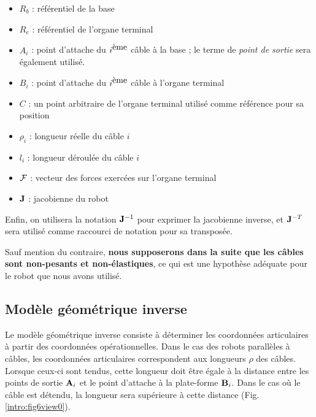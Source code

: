 \begin{itemize}
 \item $R_b$ : référentiel de la base
 \item $R_e$ : référentiel de l'organe terminal
 \item $A_i$ : point d'attache du $i^{\hbox{ème}}$ câble à la base ; le terme 
de 
{\it point de sortie} sera également utilisé.
 \item $B_i$ : point d'attache du $i^{\hbox{ème}}$ câble à l'organe terminal
 \item $C$ : un point arbitraire de l'organe terminal utilisé comme référence 
pour sa position
 \item $\rho_i$ : longueur réelle du câble $i$
 \item $l_i$ : longueur déroulée du câble $i$
 \item $\boldmath {\mathcal F}$ : vecteur des forces exercées sur l'organe 
terminal
 \item $\bf J$ : jacobienne du robot
\end{itemize}
Enfin, on utilisera la notation ${\bf J}^{-1}$ pour exprimer la jacobienne 
inverse, et ${\bf J}^{-T}$ sera utilisé comme raccourci de notation pour sa 
transposée.

Sauf mention du contraire, {\bf nous supposerons dans la suite que les câbles 
sont non-pesants et non-élastiques}, ce qui est une hypothèse adéquate pour le 
robot que nous avons utilisé.

\subsection{Modèle géométrique inverse} \label{chap0-1-1}

Le modèle géométrique inverse consiste à déterminer les coordonnées 
articulaires 
à partir des coordonnées opérationnelles. Dans le cas des robots parallèles à 
câbles, les coordonnées articulaires correspondent aux longueurs $\rho$ des 
câbles. Lorsque ceux-ci sont tendus, cette longueur doit être égale à la 
distance entre les points de sortie ${\bf A}_i$ et le point d'attache à la 
plate-forme ${\bf B}_i$. Dans le cas où le câble est détendu, la longueur sera 
supérieure à cette distance (Fig.\ref{intro:fig6view0}).\\

